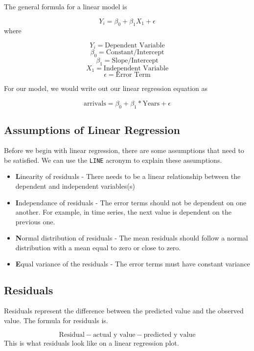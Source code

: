 \documentclass[
]{book}
\begin{document}
The general formula for a linear model is

\[Y_{i} = \beta_{0} + \beta_{1}X_{1} + \epsilon \]
where

\[Y_{i} = \text{Dependent Variable}\]
\[\beta_{0} = \text{Constant/Intercept}\]
\[\beta_{1} = \text{Slope/Intercept}\]
\[X_{1} = \text{Independent Variable}\]
\[\epsilon = \text{Error Term}\]

For our model, we would write out our linear regression equation as

\[\text{arrivals} = \beta_{0} + \beta_{1}*\text{Years} + \epsilon\]

\hypertarget{assumptions-of-linear-regression}{%
\subsection{Assumptions of Linear Regression}\label{assumptions-of-linear-regression}}

Before we begin with linear regression, there are some assumptions that need to be satisfied. We can use the \texttt{LINE} acronym to explain these assumptions.

\begin{itemize}
\item
  \textbf{L}inearity of residuals - There needs to be a linear relationship between the dependent and independent variables(s)
\item
  \textbf{I}ndependance of residuals - The error terms should not be dependent on one another. For example, in time series, the next value is dependent on the previous one.
\item
  \textbf{N}ormal distribution of residuals - The mean residuals should follow a normal distribution with a mean equal to zero or close to zero.
\item
  \textbf{E}qual variance of the residuals - The error terms must have constant variance
\end{itemize}

\hypertarget{residuals}{%
\subsection{Residuals}\label{residuals}}

Residuals represent the difference between the predicted value and the observed value. The formula for residuals is.

\[\text{Residual} - \text{actual y value} - \text{predicted y value}\]
This is what residuals look like on a linear regression plot.
\end{document}
